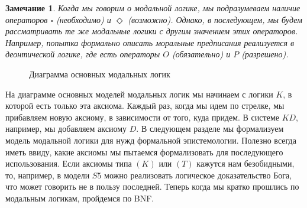 \documentclass[openany]{book}
\theoremstyle{plain}
\newtheorem{note}{Замечание}[section]
\theoremstyle{definition}
\begin{document}
\begin{note}
    Когда мы говорим о модальной логике, мы подразумеваем наличие операторов \(\square\) (необходимо) и \(\Diamond\) (возможно). Однако, в последующем, мы будем рассматривать те же модальные логики с другим значением этих операторов. Например, попытка формально описать моральные предписания реализуется в деонтической логике, где есть операторы \(O\) (обязательно) и \(P\) (разрешено).
\end{note}

\begin{figure}[H]
    \centering
    \caption{Диаграмма основных модальных логик}
\end{figure}

На диаграмме основных моделей модальных логик мы начинаем с логики \(K\),  в которой есть только эта аксиома. Каждый раз, когда мы идем по стрелке, мы прибавляем новую аксиому, в зависимости от того, куда придем. В системе \(KD\), например, мы добавляем аксиому \(D\). В следующем разделе мы формализуем модель модальной логики для нужд формальной эпистемологии. Полезно всегда иметь ввиду, какие аксиомы мы пытаемся формализовать для последующего использования. Если аксиомы типа \((K)\) или \((T)\) кажутся нам безобидными, то, например, в модели \(S5\) можно реализовать логическое доказательство Бога, что может говорить не в пользу последней. Теперь когда мы кратко прошлись по модальным логикам, пройдемся по BNF.
\end{document}
